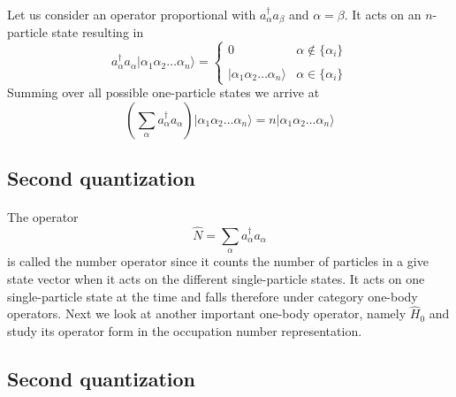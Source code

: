\documentclass[%
twoside,                 %
final,                   %
10pt]{article}
\begin{document}
\paragraph{}
Let us consider an operator proportional with $a_\alpha^{\dagger} a_\beta$ and 
$\alpha=\beta$. It acts on an $n$-particle state 
resulting in
\begin{equation}
	a_\alpha^{\dagger} a_\alpha |\alpha_1\alpha_2 \dots \alpha_{n}\rangle = 
	\begin{cases}
		0  &\alpha \notin \{\alpha_i\} \\
		\\
		|\alpha_1\alpha_2 \dots \alpha_{n}\rangle & \alpha \in \{\alpha_i\}
	\end{cases}
\end{equation}
Summing over all possible one-particle states we arrive at
\begin{equation}
	\left( \sum_\alpha a_\alpha^{\dagger} a_\alpha \right) |\alpha_1\alpha_2 \dots \alpha_{n}\rangle = 
	n |\alpha_1\alpha_2 \dots \alpha_{n}\rangle \label{eq:2-21}
\end{equation}




\subsection*{Second quantization}

\paragraph{}
The operator 
\begin{equation}
	\hat{N} = \sum_\alpha a_\alpha^{\dagger} a_\alpha \label{eq:2-22}
\end{equation}
is called the number operator since it counts the number of particles in a give state vector when it acts 
on the different single-particle states.  It acts on one single-particle state at the time and falls 
therefore under category one-body operators.
Next we look at another important one-body operator, namely $\hat{H}_0$ and study its operator form in the 
occupation number representation.




\subsection*{Second quantization}
\end{document}
